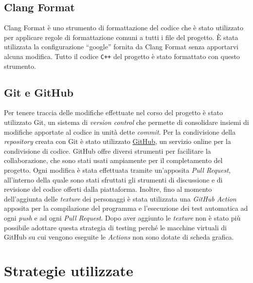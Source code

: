 \documentclass{article}
\newcommand{\quotes}[1]{``#1''}
\begin{document}
\subsection{Clang Format}
Clang Format è uno strumento di formattazione del codice che è stato utilizzato per applicare regole di formattazione comuni a tutti i file del progetto. È stata utilizzata la configurazione \quotes{google} fornita da Clang Format senza apportarvi alcuna modifica. Tutto il codice \verb|C++| del progetto è stato formattato con questo strumento.

\subsection{Git e GitHub}
Per tenere traccia delle modifiche effettuate nel corso del progetto è stato utilizzato Git, un sistema di \textit{version control} che permette di consolidare insiemi di modifiche apportate al codice in unità dette \textit{commit}. Per la condivisione della \textit{repository} creata con Git è stato utilizzato \href{https://github.com/LuckeeDev/fnad}{GitHub}, un servizio online per la condivisione di codice. GitHub offre diversi strumenti per facilitare la collaborazione, che sono stati usati ampiamente per il completamento del progetto. Ogni modifica è stata effettuata tramite un'apposita \textit{Pull Request}, all'interno della quale sono stati sfruttati gli strumenti di discussione e di revisione del codice offerti dalla piattaforma. Inoltre, fino al momento dell'aggiunta delle \textit{texture} dei personaggi è stata utilizzata una \textit{GitHub Action} apposita per la compilazione del programma e l'esecuzione dei test automatica ad ogni \textit{push} e ad ogni \textit{Pull Request}. Dopo aver aggiunto le \textit{texture} non è stato più possibile adottare questa strategia di testing perché le macchine virtuali di GitHub su cui vengono eseguite le \textit{Actions} non sono dotate di scheda grafica.

\section{Strategie utilizzate}
\end{document}

